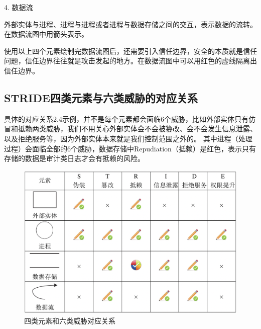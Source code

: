 4.  数据流

外部实体与进程、进程与进程或者进程与数据存储之间的交互，表示数据的流转。在数据流图中用箭头表示。

使用以上四个元素绘制完数据流图后，还需要引入信任边界，安全的本质就是信任问题，信任边界往往就是攻击发起的地方。在数据流图中可以用红色的虚线隔离出信任边界。



\subsection{STRIDE四类元素与六类威胁的对应关系}

具体的对应关系2.4示例，并不是每个元素都会面临6个威胁，比如外部实体只有仿冒和抵赖两类威胁，我们不用关心外部实体会不会被篡改、会不会发生信息泄露、以及拒绝服务等，因为外部实体本来就是我们控制范围之外的。
其中进程（处理过程）会面临全部的6个威胁，数据存储中Repudiation（抵赖）是红色，表示只有存储的数据是审计类日志才会有抵赖的风险。
\begin{figure}
    \centering
    \includegraphics[scale=0.6]{resources/img/i77.png}
    \caption{四类元素和六类威胁对应关系}
  \end{figure}

